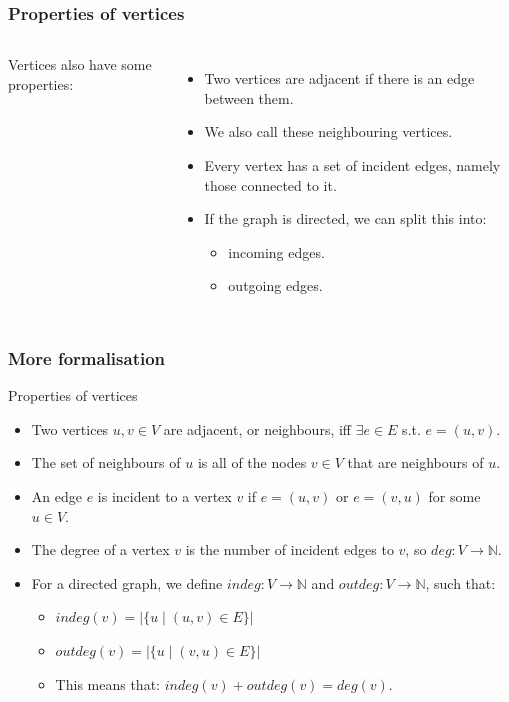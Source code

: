 \begin{frame}
	\frametitle{Properties of vertices}
		
	\begin{columns}
			
		Vertices also have some properties:
		\pause
		\begin{itemize}
			\item Two vertices are \alert{adjacent} if there is an edge between them.
			\item We also call these \alert{neighbouring} vertices.
				\pause
			\item Every vertex has a set of \alert{incident} edges, namely those connected to it.
				\pause
			\item If the graph is directed, we can split this into:
				\begin{itemize}
					\item \alert{incoming} edges.
						\pause
					\item \alert{outgoing} edges.
				\end{itemize}
		\end{itemize}
	\end{columns}
\end{frame}

\begin{frame}
	\frametitle{More formalisation}
	\begin{block}{Properties of vertices}
		\begin{itemize}
			\item Two vertices $u,v \in V$ are adjacent, or neighbours, iff $\exists e \in E$ s.t. $e=(u,v)$.
				\pause
			\item The set of neighbours of $u$ is all of the nodes $v \in V$ that are neighbours of $u$.
				\pause
			\item An edge $e$ is incident to a vertex $v$ if $e=(u,v)$ or $e = (v,u)$ for some $u \in V$.
				\pause
			\item The \alert{degree} of a vertex $v$ is the number of incident edges to $v$, so $\mathit{deg}: V \to \mathbb{N}$.
				\pause
			\item For a directed graph, we define $\mathit{indeg}: V \to \mathbb{N}$ and $\mathit{outdeg}: V \to \mathbb{N}$,
				such that:
				\pause
				\begin{itemize}
					\item $\mathit{indeg}(v) = | \{u \mid (u,v) \in E\}|$
					\item $\mathit{outdeg}(v) = | \{u \mid (v,u) \in E\}|$
						\pause
					\item This means that: $\mathit{indeg}(v) + \mathit{outdeg}(v) = \mathit{deg}(v)$.
				\end{itemize}
		\end{itemize}
	\end{block}	
\end{frame}

